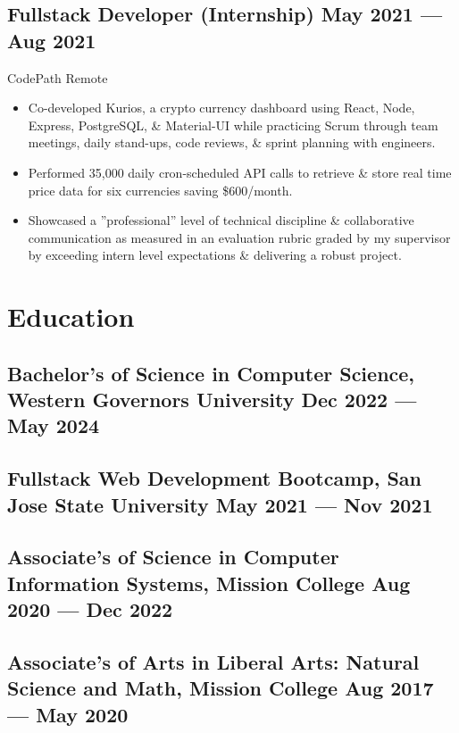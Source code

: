 \documentclass[a4,10pt]{article}
\newcommand{\subtext}[1]{
#1\par\vspace{-0.2cm}}
\newenvironment{zitemize}{
\begin{itemize}\itemsep0pt \parskip0pt \parsep1pt}
{\end{itemize}\vspace{-0.5cm}}
\begin{document}
\subsection*{Fullstack Developer {\normalsize \normalfont(Internship) } \hfill  May 2021 --- Aug 2021 }
\subtext{CodePath \hfill Remote } 
    \begin{zitemize}
        \item Co-developed Kurios, a crypto currency dashboard using React, Node, Express, PostgreSQL, \& Material-UI while practicing Scrum through team meetings, daily stand-ups, code reviews, \& sprint planning with engineers.
        \item Performed 35,000 daily cron-scheduled API calls to retrieve \& store real time price data for six currencies saving \$600/month.
        \item Showcased a ”professional” level of technical discipline \& collaborative communication as measured in an evaluation rubric graded by my supervisor by exceeding intern level expectations \& delivering a robust project.
    \end{zitemize}





\section{Education}
\subsection*{Bachelor's of Science in Computer Science, {\normalsize \normalfont Western Governors University} \hfill Dec 2022 --- May 2024} 
\vspace{0.2cm}
\subsection*{Fullstack Web Development Bootcamp, {\normalsize \normalfont San Jose State University} \hfill May 2021 --- Nov 2021} 
\vspace{0.2cm}
\subsection*{Associate's of Science in Computer Information Systems, {\normalsize \normalfont Mission College} \hfill Aug 2020 --- Dec 2022} 
\vspace{0.2cm}
\subsection*{Associate's of Arts in Liberal Arts: Natural Science and Math, {\normalsize \normalfont Mission College} \hfill Aug 2017 --- May 2020} 
{\hfill}


\end{document}

